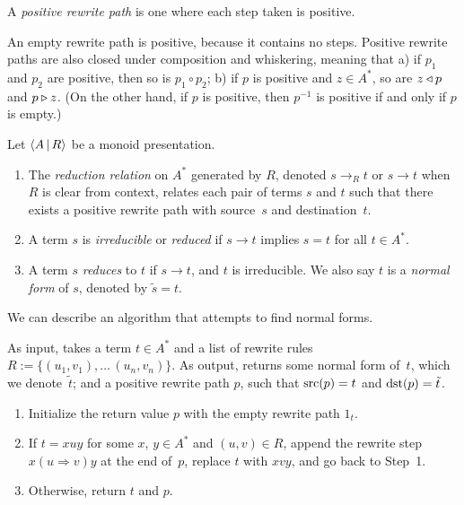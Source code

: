\documentclass[../generics]{subfiles}
\begin{document}
\begin{definition}
A \emph{positive rewrite path} is one where each step taken is positive.
\end{definition}
An empty rewrite path is positive, because it contains no steps. Positive rewrite paths are also closed under composition and whiskering, meaning that a) if $p_1$ and $p_2$ are positive, then so is $p_1\circ p_2$; b) if $p$ is positive and $z\in A^*$, so are $z\triangleleft p$ and $p\triangleright z$. (On the other hand, if $p$ is positive, then $p^{-1}$ is positive if and only if $p$ is empty.)

\begin{definition}
Let $\langle A\,|\,R\rangle$ be a monoid presentation.
\begin{enumerate}
\item The \emph{reduction relation} on $A^*$ generated by $R$, denoted \index{$\rightarrow$}$s\rightarrow_R t$ or $s\rightarrow t$ when $R$ is clear from context, relates each pair of terms $s$ and $t$ such that there exists a positive rewrite path with source~$s$ and destination~$t$.

\item A term $s$ is \emph{irreducible} or \emph{reduced} if $s\rightarrow t$ implies $s=t$ for all $t\in A^*$.

\item A term $s$ \emph{reduces} to $t$ if $s\rightarrow t$, and $t$ is irreducible. We also say $t$ is a \emph{normal form} of $s$, denoted by $\tilde{s} = t$.
\end{enumerate}
\end{definition}

We can describe an algorithm that attempts to find normal forms.

\begin{algorithm}\label{term reduction algo}
As input, takes a term $t\in A^*$ and a list of rewrite rules $R:=\{(u_1,v_1),\ldots\,(u_n,v_n)\}$. As output, returns some normal form of~$t$, which we denote~$\tilde{t}$; and a positive rewrite path $p$, such that $\operatorname{src}(p)=t$ and $\operatorname{dst}(p)=\tilde{t}$.
\begin{enumerate}
\item Initialize the return value $p$ with the empty rewrite path $1_t$.
\item If $t=xuy$ for some $x$, $y\in A^*$ and $(u,v)\in R$, append the rewrite step $x(u\Rightarrow v)y$ at the end of~$p$, replace $t$ with $xvy$, and go back to Step~1.
\item Otherwise, return $t$ and $p$.
\end{enumerate}
\end{algorithm}
\end{document}
